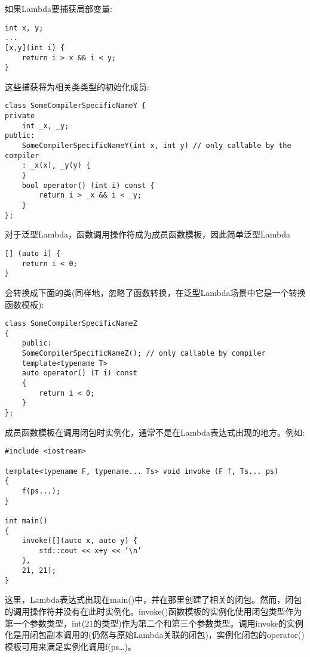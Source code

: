 如果Lambda要捕获局部变量:

\begin{lstlisting}[style=styleCXX]
int x, y;
...
[x,y](int i) {
	return i > x && i < y;
}
\end{lstlisting}

这些捕获将为相关类类型的初始化成员:

\begin{lstlisting}[style=styleCXX]
class SomeCompilerSpecificNameY {
private
	int _x, _y;
public:
	SomeCompilerSpecificNameY(int x, int y) // only callable by the compiler
	: _x(x), _y(y) {
	}
	bool operator() (int i) const {
		return i > _x && i < _y;
	}
};
\end{lstlisting}

对于泛型Lambda，函数调用操作符成为成员函数模板，因此简单泛型Lambda

\begin{lstlisting}[style=styleCXX]
[] (auto i) {
	return i < 0;
}
\end{lstlisting}

会转换成下面的类(同样地，忽略了函数转换，在泛型Lambda场景中它是一个转换函数模板):

\begin{lstlisting}[style=styleCXX]
class SomeCompilerSpecificNameZ
{
	public:
	SomeCompilerSpecificNameZ(); // only callable by compiler
	template<typename T>
	auto operator() (T i) const
	{
		return i < 0;
	}
};
\end{lstlisting}

成员函数模板在调用闭包时实例化，通常不是在Lambda表达式出现的地方。例如:

\begin{lstlisting}[style=styleCXX]
#include <iostream>

template<typename F, typename... Ts> void invoke (F f, Ts... ps)
{
	f(ps...);
}

int main()
{
	invoke([](auto x, auto y) {
		std::cout << x+y << ’\n’
	},
	21, 21);
}
\end{lstlisting}

这里，Lambda表达式出现在main()中，并在那里创建了相关的闭包。然而，闭包的调用操作符并没有在此时实例化。invoke()函数模板的实例化使用闭包类型作为第一个参数类型，int(21的类型)作为第二个和第三个参数类型。调用invoke的实例化是用闭包副本调用的(仍然与原始Lambda关联的闭包)，实例化闭包的operator()模板可用来满足实例化调用f(ps…)。












